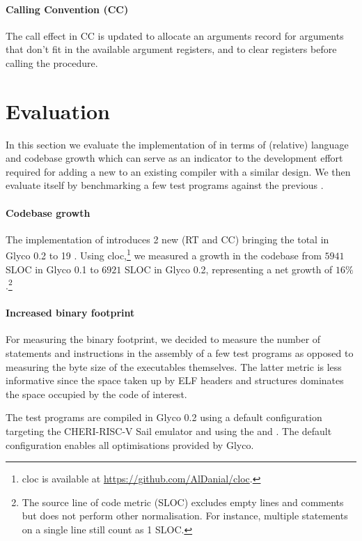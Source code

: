\documentclass[main.tex]{subfiles}
\begin{document}
\paragraph{Calling Convention (CC)} The call effect in CC is updated to allocate an arguments record for arguments that don't fit in the available argument registers, and to clear registers before calling the procedure.


\section{Evaluation} \label{sct:ghscc-eval}
In this section we evaluate the implementation of  in terms of (relative) language and codebase growth which can serve as an indicator to the development effort required for adding a new  to an existing  compiler with a similar design. We then evaluate  itself by benchmarking a few test programs against the previous .

\paragraph{Codebase growth} The implementation of  introduces 2 new  (RT and CC) bringing the total in Glyco 0.2 to 19 . Using cloc,\footnote{cloc is available at \url{https://github.com/AlDanial/cloc}.} we measured a growth in the codebase from $5941$ SLOC in Glyco 0.1 to $6921$ SLOC in Glyco 0.2, representing a net growth of $16\%$.\footnote{The source line of code metric (SLOC) excludes empty lines and comments but does not perform other normalisation. For instance, multiple statements on a single line still count as 1 SLOC.}

\paragraph{Increased binary footprint} For measuring the binary footprint, we decided to measure the number of statements and instructions in the assembly of a few test programs as opposed to measuring the byte size of the executables themselves. The latter metric is less informative since the space taken up by ELF headers and structures dominates the space occupied by the code of interest.

The test programs are compiled in Glyco 0.2 using a default configuration targeting the CHERI-RISC-V Sail emulator and using the  and  . The default configuration enables all optimisations provided by Glyco.
\end{document}
